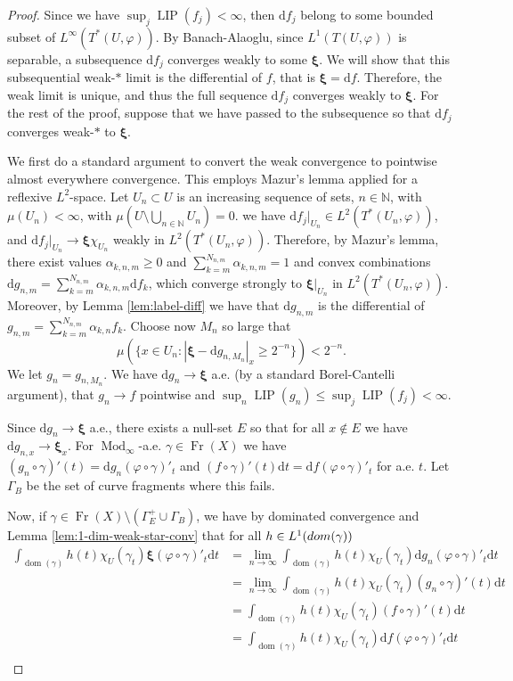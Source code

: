 \documentclass{amsart}
\numberwithin{equation}{section}
\newcommand{\N}{\mathbb{N}}
\newcommand{\Mod}{\operatorname{Mod}}
\newcommand{\LIP}{\operatorname{LIP}}
\newcommand{\dom}{\operatorname{dom}}
\newcommand{\Fr}{\operatorname{Fr}}
\newcommand{\ud}{\mathrm {d}}
\begin{document}
\begin{proof}
    Since we have $\sup_j\LIP(f_j)<\infty$, then $\ud f_j$ belong to some bounded subset of $L^\infty(T^*(U,\varphi))$. By Banach-Alaoglu, since $L^1(T(U,\varphi))$ is separable, a subsequence $\ud f_j$ converges weakly to some $\bm\xi$. We will show that this subsequential weak-$\ast$ limit is the differential of $f$, that is $\bm\xi = \ud f$. Therefore, the weak limit is unique, and thus the full sequence $\ud f_j$ converges weakly to $\bm\xi$. For the rest of the proof, suppose that we have passed to the subsequence so that $\ud f_j$ converges weak-$\ast$ to $\bm\xi$. 

    We first do a standard argument to convert the weak convergence to pointwise almost everywhere convergence. This employs Mazur's lemma applied for a reflexive $L^2$-space. Let $U_n\subset U$ is an increasing sequence of sets, $n\in \N$, with  $\mu(U_n)<\infty$, with $\mu(U\setminus \bigcup_{n\in \N} U_n)=0$. we have $\ud f_j|_{U_n} \in L^2(T^*(U_n,\varphi))$, and $\ud f_j|_{U_n} \to \bm\xi \chi_{U_n}$ weakly in $L^2(T^*(U_n,\varphi))$. Therefore, by Mazur's lemma, there exist values $\alpha_{k,n,m}\geq 0$ and $\sum_{k=m}^{N_{n,m}} \alpha_{k,n,m}=1$ and convex combinations $\ud g_{n,m} = \sum_{k=m}^{N_{n,m}} \alpha_{k,n,m} \ud f_k$, which converge strongly to $\bm\xi|_{U_n}$ in $L^2(T^*(U_n,\varphi))$. Moreover, by Lemma \ref{lem:label-diff} we have that $\ud g_{n,m}$ is the differential of  $g_{n,m} = \sum_{k=m}^{N_{n,m}} \alpha_{k,n} f_k$. Choose now $M_n$ so large that
    \[
    \mu(\{ x \in U_n : |\bm\xi - \ud g_{n,M_n}|_x\geq 2^{-n}\})<2^{-n}.
    \]
    We let $g_n = g_{n,M_n}$. We have $\ud g_n \to \bm \xi$ a.e. (by a standard Borel-Cantelli argument), that $g_n \to f$ pointwise and $\sup_n\LIP(g_n)\leq \sup_j\LIP(f_j)<\infty$.

    Since $\ud g_n \to \bm \xi$ a.e., there exists a null-set $E$ so that for all $x\not\in E$ we have $\ud g_{n,x}\to \bm\xi_x$.  For $\Mod_\infty$-a.e. $\gamma\in \Fr(X)$ we have $(g_n\circ\gamma)'(t)=\ud g_n(\varphi \circ \gamma)'_t$ and $(f\circ\gamma)'(t)\ud t=\ud f(\varphi \circ \gamma)'_t$ for a.e. $t$. Let $\Gamma_B$ be the set of curve fragments where this fails.
    
    Now, if $\gamma \in \Fr(X)\setminus (\Gamma_E^+\cup \Gamma_B)$, we have by dominated convergence and Lemma \ref{lem:1-dim-weak-star-conv} that for all $h\in L^1({\rm dom(\gamma)})$
    \begin{align*}
    \int_{\dom(\gamma)} h(t) \chi_U(\gamma_t)\bm \xi(\varphi \circ \gamma)'_t \ud t &=
    \lim_{n\to\infty}\int_{\dom(\gamma)} h(t) \chi_U(\gamma_t) \ud g_n(\varphi \circ \gamma)'_t \ud t \\
    &=\lim_{n\to\infty}\int_{\dom(\gamma)} h(t) \chi_U(\gamma_t) (g_n\circ\gamma)'(t)\ud t \\
    &=\int_{\dom(\gamma)} h(t) \chi_U(\gamma_t)(f\circ\gamma)'(t)\ud t \\
    &=\int_{\dom(\gamma)} h(t) \chi_U(\gamma_t) \ud f(\varphi \circ \gamma)'_t \ud t \\
    \end{align*}


\end{proof}
\end{document}
